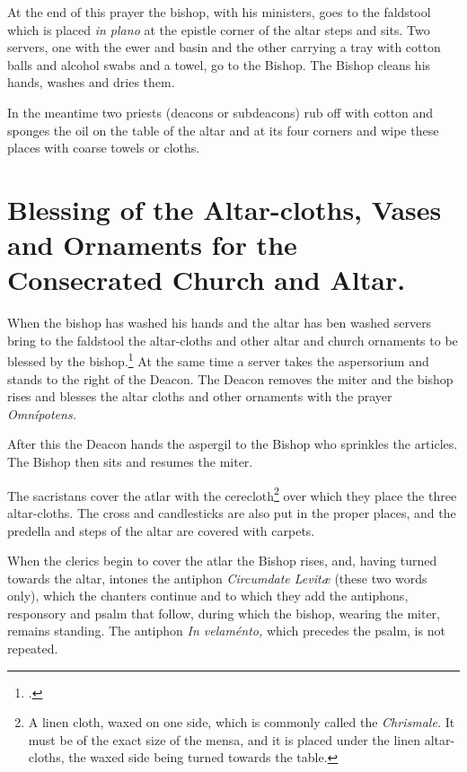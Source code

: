 \documentclass[letterpaper]{report}
\begin{document}
{\rubric At the end of this prayer the bishop, with his ministers, goes to the
faldstool which is placed \textit{in plano} at the epistle corner of the altar
steps and sits. Two servers, one with the ewer and basin and the other carrying
a tray with cotton balls and alcohol swabs and a towel, go to the Bishop. The
Bishop cleans his hands, washes and dries them.

In the meantime two priests (deacons or subdeacons) rub off with cotton and
sponges the oil on the table of the altar and at its four corners and wipe
these places with coarse towels or cloths.

\section{Blessing of the Altar-cloths, Vases and Ornaments for the Consecrated Church and Altar.}

\rubric When the bishop has washed his hands and the altar has ben washed
servers bring to the faldstool the altar-cloths and other altar and church
ornaments to be blessed by the bishop.\footcite[In case they should be very
numerous, they may be left on a table to which the bishop goes and there
blesses them.][footnote 4, p. 128.]{consecranda} At the same time a server
takes the aspersorium and stands to the right of the Deacon. The Deacon removes
the miter and the bishop rises and blesses the altar cloths and other ornaments
with the prayer \textit{Omnípotens.}

After this the Deacon hands the aspergil to the Bishop who sprinkles the
articles. The Bishop then sits and resumes the miter.

\rubric The sacristans cover the atlar with the cerecloth\footnote{A linen
cloth, waxed on one side, which is commonly called the \textit{Chrismale.} It
must be of the exact size of the mensa, and it is placed under the linen
altar-cloths, the waxed side being turned towards the table.} over which they
place the three altar-cloths. The cross and candlesticks are also put in the
proper places, and the predella and steps of the altar are covered with
carpets.

When the clerics begin to cover the atlar the Bishop rises, and, having turned
towards the altar, intones the antiphon \textit{Circumdate Levit\ae} (these two
words only), which the chanters continue and to which they add the antiphons,
responsory and psalm that follow, during which the bishop, wearing the miter,
remains standing. The antiphon \textit{In velaménto,} which precedes the psalm,
is not repeated.

}
\end{document}
